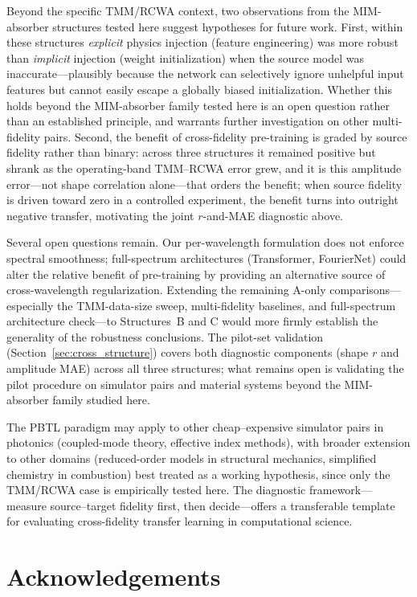 \documentclass[a4paper,fleqn]{cas-sc}
\begin{document}
Beyond the specific TMM/RCWA context, two observations from the MIM-absorber structures tested here suggest hypotheses for future work. First, within these structures \emph{explicit} physics injection (feature engineering) was more robust than \emph{implicit} injection (weight initialization) when the source model was inaccurate---plausibly because the network can selectively ignore unhelpful input features but cannot easily escape a globally biased initialization. Whether this holds beyond the MIM-absorber family tested here is an open question rather than an established principle, and warrants further investigation on other multi-fidelity pairs. Second, the benefit of cross-fidelity pre-training is graded by source fidelity rather than binary: across three structures it remained positive but shrank as the operating-band TMM--RCWA error grew, and it is this amplitude error---not shape correlation alone---that orders the benefit; when source fidelity is driven toward zero in a controlled experiment, the benefit turns into outright negative transfer, motivating the joint $r$-and-MAE diagnostic above.

Several open questions remain. Our per-wavelength formulation does not enforce spectral smoothness; full-spectrum architectures (Transformer, FourierNet) could alter the relative benefit of pre-training by providing an alternative source of cross-wavelength regularization. Extending the remaining A-only comparisons---especially the TMM-data-size sweep, multi-fidelity baselines, and full-spectrum architecture check---to Structures~B and C would more firmly establish the generality of the robustness conclusions. The pilot-set validation (Section~\ref{sec:cross_structure}) covers both diagnostic components (shape $r$ and amplitude MAE) across all three structures; what remains open is validating the pilot procedure on simulator pairs and material systems beyond the MIM-absorber family studied here.

The PBTL paradigm may apply to other cheap--expensive simulator pairs in photonics (coupled-mode theory, effective index methods), with broader extension to other domains (reduced-order models in structural mechanics, simplified chemistry in combustion) best treated as a working hypothesis, since only the TMM/RCWA case is empirically tested here. The diagnostic framework---measure source--target fidelity first, then decide---offers a transferable template for evaluating cross-fidelity transfer learning in computational science.

\section*{Acknowledgements}
\end{document}
